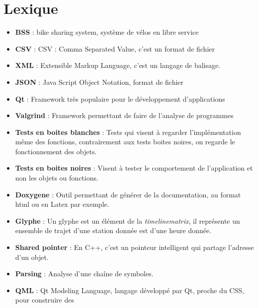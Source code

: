 \documentclass[12pt]{article}
\begin{document}
	\section{Lexique}
	\begin{itemize}
		\item[]\textbf{BSS} : bike sharing system, système de vélos en libre service\\
		\item[]\textbf{CSV} : CSV : Comma Separated Value, c'est un format de fichier\\
		\item[]\textbf{XML} : Extensible Markup Language, c'est un langage de balisage.\\
		\item[]\textbf{JSON} : Java Script Object Notation, format de fichier\\
		\item[]\textbf{Qt} : Framework très populaire pour le développement
		d'applications\\
		\item[]\textbf{Valgrind} : Framework permettant de faire de l'analyse de programmes\\
		\item[]\textbf{Tests en boites blanches} : Tests qui visent à regarder l’implémentation même 
		des fonctions, contrairement aux tests boites noires, on regarde le fonctionnement des objets.\\
		\item[]\textbf{Tests en boites noires} : Visent à tester le comportement de l'application et non
		les objets ou fonctions.\\
		\item[]\textbf{Doxygene} : Outil permettant de générer de la documentation,
		au format html ou en Latex par exemple.\\
		\item[]\textbf{Glyphe} : Un glyphe est un élément de la \textit{timelinematrix}, il
		représente un ensemble de trajet d'une station donnée est d'une heure donnée.\\
		\item[]\textbf{Shared pointer} : En C++, c'est un pointeur intelligent qui partage l'adresse
		d'un objet.\\
		\item[]\textbf{Parsing} : Analyse d'une chaîne de symboles.\\
		\item[]\textbf{QML} : Qt Modeling Language, langage développé par Qt, proche du CSS, pour construire des

\end{itemize}
\end{document}
